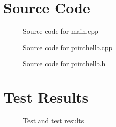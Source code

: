 \documentclass[12pt]{article}
\begin{document}
\maketitle
\pagebreak


\section{Source Code}

\begin{figure}[h]
    
    \caption{Source code for \textsf{main.cpp}}
    \label{fig:source}
\end{figure}

\begin{figure}[h]
    
    \caption{Source code for \textsf{printhello.cpp}}
    \label{fig:printhello}
\end{figure}

\begin{figure}[h]
    
    \caption{Source code for \textsf{printhello.h}}
    \label{fig:header}
\end{figure}


\newpage



\section{Test Results}

\begin{figure}[h]
    
    \caption{Test and test results}
    \label{fig:results}
\end{figure}
\end{document}
